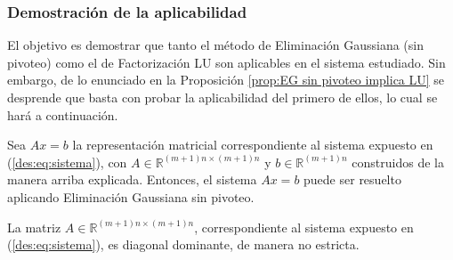     \subsubsection{Demostración de la aplicabilidad}

        El objetivo es demostrar que tanto el método de Eliminación Gaussiana (sin pivoteo) como el de Factorización LU son aplicables en el sistema estudiado. Sin embargo, de lo enunciado en la Proposición \ref{prop:EG sin pivoteo implica LU} se desprende que basta con probar la aplicabilidad del primero de ellos, lo cual se hará a continuación.

        Sea $Ax=b$ la representación matricial correspondiente al sistema expuesto en (\ref{des:eq:sistema}), con $A \in \mathbb{R}^{(m+1)n \times (m+1)n}$ y $b \in \mathbb{R}^{(m+1)n}$ construidos de la manera arriba explicada. Entonces, el sistema $Ax=b$ puede ser resuelto aplicando Eliminación Gaussiana sin pivoteo.

        La matriz $A \in \mathbb{R}^{(m+1)n \times (m+1)n}$, correspondiente al sistema expuesto en (\ref{des:eq:sistema}), es diagonal dominante, de manera no estricta.

